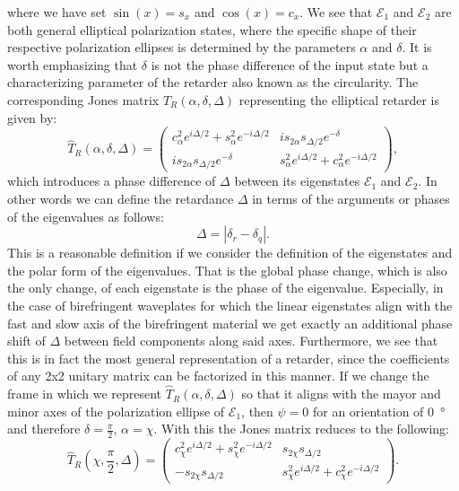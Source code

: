 where we have set $\sin(x) = s_x$ and $\cos(x) = c_x$. We see that $\bm{\mathcal{E}}_1$ and $\bm{\mathcal{E}}_2$ are both general elliptical polarization states, where the specific shape of their respective polarization ellipses is determined by the parameters $\alpha$ and $\delta$. It is worth emphasizing that $\delta$ is not the phase difference of the input state but a characterizing parameter of the retarder also known as the circularity. The corresponding Jones matrix $T_R(\alpha, \delta, \Delta)$ representing the elliptical retarder is given by:
\begin{equation}
    \hat{T}_R(\alpha, \delta, \Delta) = 
    \begin{pmatrix} 
    c^2_{\alpha}  e^{i\Delta /2} + s^2_{\alpha} e^{-i\Delta /2} & i s_{2\alpha} s_{\Delta/2} e^{-\delta} \\ 
    i s_{2\alpha} s_{\Delta/2} e^{-\delta} & s^2_{\alpha} e^{i\Delta/2} + c^2_{\alpha} e^{-i\Delta /2}
    \end{pmatrix}, 
\end{equation}
which introduces a phase difference of $\Delta$ between its eigenstates $\bm{\mathcal{E}}_1$ and $\bm{\mathcal{E}}_2$. In other words we can define the retardance $\Delta$ in terms of the arguments or phases of the eigenvalues as follows:
\begin{equation}
    \label{eq:jones_ret_def}
    \Delta = |\delta_r-\delta_q|.
\end{equation}
This is a reasonable definition if we consider the definition of the eigenstates and the polar form of the eigenvalues. That is the global phase change, which is also the only change, of each eigenstate is the phase of the eigenvalue. Especially, in the case of birefringent waveplates for which the linear eigenstates align with the fast and slow axis of the birefringent material we get exactly an additional phase shift of $\Delta$ between field components along said axes. Furthermore, we see that this is in fact the most general representation of a retarder, since the coefficients of any 2x2 unitary matrix can be factorized in this manner. If we change the frame in which we represent $\hat{T}_R(\alpha, \delta, \Delta)$ so that it aligns with the mayor and minor axes of the polarization ellipse of $\bm{\mathcal{E}}_1$, then $\psi=0$ for an orientation of \SI{0}{\degree} and therefore $\delta=\frac{\pi}{2}$, $\alpha=\chi$. With this the Jones matrix reduces to the following:
\begin{equation}
    \hat{T}_R\left(\chi, \frac{\pi}{2}, \Delta\right) = 
    \begin{pmatrix} 
    c^2_{\chi} e^{i\Delta /2} + s^2_{\chi} e^{-i\Delta /2} & s_{2\chi} s_{\Delta/2} \\
    -s_{2\chi} s_{\Delta/2} & s^2_{\chi} e^{i\Delta /2} + c^2_{\chi} e^{-i\Delta /2}
    \end{pmatrix}. 
\end{equation}

